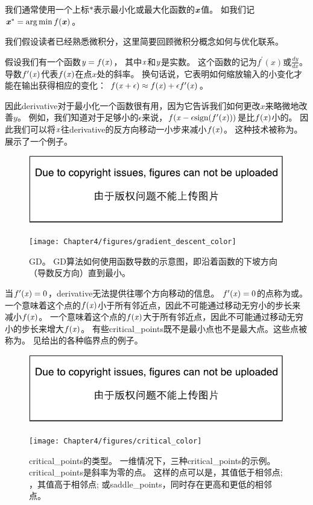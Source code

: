 我们通常使用一个上标$*$表示最小化或最大化函数的$\boldsymbol{\mathit{x}}$值。
如我们记$\boldsymbol{\mathit{x}}^*=\arg\min f(\boldsymbol{\mathit{x}})$。

我们假设读者已经熟悉微积分，这里简要回顾微积分概念如何与优化联系。


假设我们有一个函数$\mathit{y} = f(\mathit{x})$， 其中$\mathit{x}$和$\mathit{y}$是实数。
这个函数的记为$f^\prime(x)$或$\frac{dy}{dx}$。
导数$f^\prime(\mathit{x})$代表$f(\mathit{x})$在点$x$处的斜率。
换句话说，它表明如何缩放输入的小变化才能在输出获得相应的变化：
$f(\mathit{x}+\epsilon) \approx f(\mathit{x}) + \epsilon f^\prime(\mathit{x}) $。

因此\gls{derivative}对于最小化一个函数很有用，因为它告诉我们如何更改$x$来略微地改善$y$。
例如，我们知道对于足够小的$\epsilon$来说，$f(\mathit{x}-\epsilon \text{sign}(f^\prime(\mathit{x})) )$是比$f(\mathit{x})$小的。
因此我们可以将$\mathit{x}$往\gls{derivative}的反方向移动一小步来减小$f(\mathit{x})$。
这种技术被称为\citep{cauchy1847}。
展示了一个例子。
\begin{figure}[!htb]
\ifOpenSource
\centerline{\includegraphics{figure.pdf}}
\else
\centerline{\texttt{[image: Chapter4/figures/gradient\_descent\_color]}}
\fi
\caption{\gls{GD}。 
\gls{GD}算法如何使用函数导数的示意图，即沿着函数的下坡方向（导数反方向）直到最小。}
\label{fig:chap4_gradient_descent_color}
\end{figure}


当$f^\prime(\mathit{x})=0$，\gls{derivative}无法提供往哪个方向移动的信息。
$ f^\prime(\mathit{x})=0 $的点称为或。
一个意味着这个点的$f(\mathit{x})$小于所有邻近点，因此不可能通过移动无穷小的步长来减小$f(\mathit{x})$。
一个意味着这个点的$f(\mathit{x})$大于所有邻近点，因此不可能通过移动无穷小的步长来增大$f(\mathit{x})$。
有些\gls{critical_points}既不是最小点也不是最大点。这些点被称为。
见给出的各种临界点的例子。
\begin{figure}[!htb]
\ifOpenSource
\centerline{\includegraphics{figure.pdf}}
\else
\centerline{\texttt{[image: Chapter4/figures/critical\_color]}}
\fi
\caption{\gls{critical_points}的类型。 
一维情况下，三种\gls{critical_points}的示例。
\gls{critical_points}是斜率为零的点。
这样的点可以是，其值低于相邻点; ，其值高于相邻点; 或\gls{saddle_points}，同时存在更高和更低的相邻点。
}
\label{fig:chap4_critical_color}
\end{figure}

